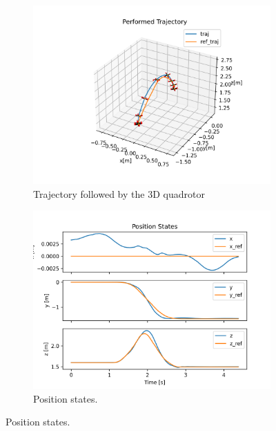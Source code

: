 \documentclass{thesisreport}
\begin{document}
\newpage

\begin{figure}[H]
	\begin{subfigure}{0.43\textwidth}
		\includegraphics[width=\linewidth]{Images/sil_simulations/performedTraj.png}
		\caption{Trajectory followed by the 3D quadrotor} \label{fig:SIL_3D_flip_3d}
	\end{subfigure}\hspace*{\fill}
	\begin{subfigure}{0.43\textwidth}
		\includegraphics[width=\linewidth]{Images/sil_simulations/posStates.png}
		\caption{Position states.} \label{fig:SIL_3D_flip_pose}
	\end{subfigure}


\end{figure}
\end{document}
